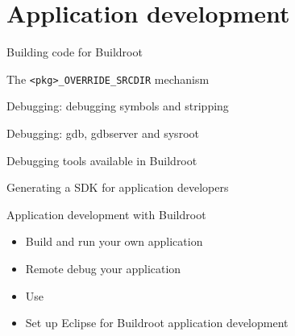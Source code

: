 \section{Application development}

\begin{frame}{Building code for Buildroot}

\end{frame}

\begin{frame}{The {\tt <pkg>\_OVERRIDE\_SRCDIR} mechanism}

\end{frame}

\begin{frame}{Debugging: debugging symbols and stripping}

\end{frame}

\begin{frame}{Debugging: gdb, gdbserver and sysroot}

\end{frame}

\begin{frame}{Debugging tools available in Buildroot}

\end{frame}

\begin{frame}{Generating a SDK for application developers}

\end{frame}

\setuplabframe
{Application development with Buildroot}
{
  \begin{itemize}
  \item Build and run your own application
  \item Remote debug your application
  \item Use 
  \item Set up Eclipse for Buildroot application development
  \end{itemize}
}
